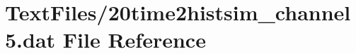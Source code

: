 \hypertarget{20time2histsim__channel5_8dat}{}\section{Text\+Files/20time2histsim\+\_\+channel5.dat File Reference}
\label{20time2histsim__channel5_8dat}
